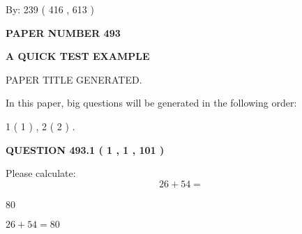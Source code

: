 \documentclass[12pt]{article}
\begin{document}
   
\hspace{1.0in} By: 
 239 ( 416 ,  613 )
   
   
   
   
\newpage 
\setcounter{page}{ 
   493001 } 
   
   
   
   
 {\textbf{ \Large{ PAPER NUMBER  493  }}}
   
   
\vspace{0.2in}
   
   
   
   
   
   
   
   
 \vspace{0.2in}
{\LARGE {\textbf{ A QUICK TEST EXAMPLE}}}
   
   
 PAPER TITLE GENERATED.
   
   
   
\vspace{0.2in}
   
In this paper, big questions will be generated in the following order: 
   
   
   1 ( 1 )
 ,
   2 ( 2 )
 .
  
\vspace{0.2in}
  
{\textbf{\Large{QUESTION
493.1 
 ( 1 , 1 , 101 )
}}}
  
  
 
Please calculate:
\begin{equation}
26 +  %
54 = \nonumber
\end{equation}
 
 
 
\noindent{}
 
 

80
 
 
\noindent{}
 
 

 
 
 
\noindent{}
 
 

$ %
26 +  %
54=   %
80$
 
 
\noindent{}
 
\end{document}
